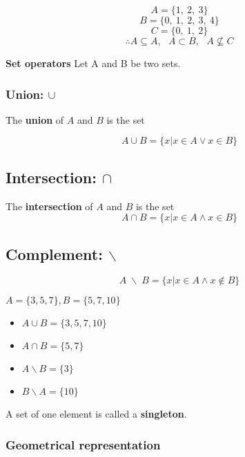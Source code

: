 \documentclass[12pt, a4paper]{book}
\begin{document}
\begin{exmp}
  \[
    A= \{ 1, \ 2, \ 3\} 
  \]
  \[
    B= \{ 0, \ 1, \ 2, \ 3, \ 4 \}
  \]
  \[
    C= \{ 0, \ 1, \ 2 \}
  \]
  \[
    \therefore
    A \subseteq A, \ \ \ A \subset B, \ \ \ A \nsubseteq C
  \]
\end{exmp}

\begin{defn}
  \textbf{Set operators}
  Let A and B be two sets. 
\end{defn}
\boldmath
\subsubsection*{Union: $\cup$}

The \textbf{union} of $A$ and $B$ is the set

\[ 
  A \cup B = \{x\vert x \in A \vee x \in B \}
\]

\subsection*{Intersection: $\cap$}

The \textbf{intersection} of $A$ and $B$ is the set
\[
  A \cap B = \{x\vert x \in A \wedge x \in B \}
\]

\subsection*{Complement: $\backslash$}

\[
  A \; \backslash \; B = \{x\vert x \in A \wedge x \notin B \}
\]
\unboldmath
\begin{exmp}
  $A=\{3,5,7\}, B=\{5,7,10\}$
  \begin{itemize}
    \item $A \cup B = \{3,5,7,10\}$
    \item $A \cap B = \{5,7\}$
    \item $A \backslash B = \{3\}$
    \item $B \backslash A = \{10\}$
  \end{itemize}
\end{exmp}

\begin{rem}
  A set of one element is called a \textbf{singleton}.
\end{rem}

\subsubsection*{Geometrical representation}
\end{document}

